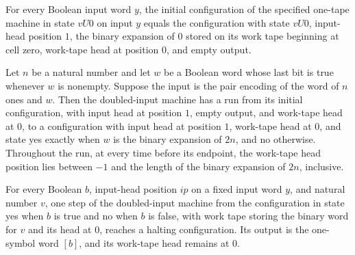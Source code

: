 \begin{lemma}
\label{Complexity.LogProg.Dbl.init_eq}
\leanok
{}
For every Boolean input word $y$, the initial configuration of the specified one-tape
machine in state $vU0$ on input $y$ equals the configuration with state $vU0$,
input-head position $1$, the binary expansion of $0$ stored on its work tape beginning
at cell zero, work-tape head at position $0$, and empty output.
\end{lemma}

\begin{lemma}
\label{Complexity.LogProg.Dbl.run_valid}
\leanok
{}
Let $n$ be a natural number and let $w$ be a Boolean word whose last bit is true
whenever $w$ is nonempty. Suppose the input is the pair encoding of the word of $n$ ones
and $w$. Then the doubled-input machine has a run from its initial configuration, with
input head at position $1$, empty output, and work-tape head at $0$, to a configuration
with input head at position $1$, work-tape head at $0$, and state yes exactly when $w$
is the binary expansion of $2n$, and no otherwise. Throughout the run, at every time
before its endpoint, the work-tape head position lies between $-1$ and the length of the
binary expansion of $2n$, inclusive.
\end{lemma}

\begin{lemma}
\label{Complexity.LogProg.Dbl.ret_step}
\leanok
{}
For every Boolean $b$, input-head position $ip$ on a fixed input word $y$, and natural
number $v$, one step of the doubled-input machine from the configuration in state yes
when $b$ is true and no when $b$ is false, with work tape storing the binary word for
$v$ and its head at $0$, reaches a halting configuration. Its output is the one-symbol
word $[b]$, and its work-tape head remains at $0$.
\end{lemma}

